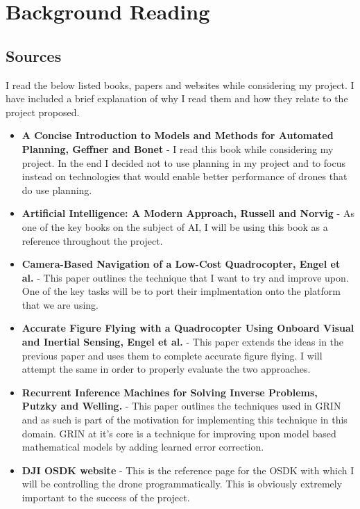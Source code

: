 \documentclass[]{../resources/final_report}
\begin{document}

\chapter{Background Reading}
\section{Sources}
I read the below listed books, papers and websites while considering my project. I have included a brief explanation of why I read them and how they relate to the project proposed.

\begin{itemize}
  \item \textbf{A Concise Introduction to Models and Methods for Automated Planning, Geffner and Bonet} \cite{Geffner:2013:CIM:2534474} -  I read this book while considering my project. In the end I decided not to use planning in my project and to focus instead on technologies that would enable better performance of drones that do use planning.
  \item \textbf{Artificial Intelligence: A Modern Approach, Russell and Norvig} \cite{Russell:2009:AIM:1671238} - As one of the key books on the subject of AI, I will be using this book as a reference throughout the project.
  \item \textbf{Camera-Based Navigation of a Low-Cost Quadrocopter, Engel et al.} \cite{CameraBasedNav}  - This paper outlines the technique that I want to try and improve upon. One of the key tasks will be to port their implmentation onto the platform that we are using.
  \item \textbf{Accurate Figure Flying with a Quadrocopter Using Onboard Visual and Inertial Sensing, Engel et al.} \cite{FigureFlying} - This paper extends the ideas in the previous paper and uses them to complete accurate figure flying. I will attempt the same in order to properly evaluate the two approaches.
  \item \textbf{Recurrent Inference Machines for Solving Inverse Problems, Putzky and Welling.} \cite{DBLP:journals/corr/PutzkyW17}  - This paper outlines the techniques used in GRIN and as such is part of the motivation for implementing this technique in this domain. GRIN at it's core is a technique for improving upon model based mathematical models by adding learned error correction.
  \item \textbf{DJI OSDK website} \cite{dji:OSDK}- This is the reference page for the OSDK with which I will be controlling the drone programmatically. This is obviously extremely important to the success of the project.

\end{itemize}
\end{document}
